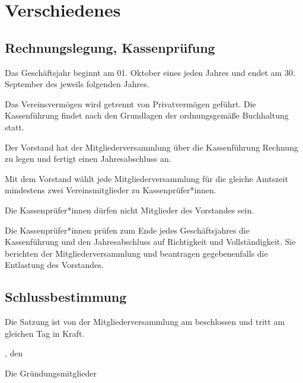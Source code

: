 \chapter{Verschiedenes}

\section{Rechnungslegung, Kassenprüfung}
\begin{absätze}
	\item Das Geschäftsjahr beginnt am 01. Oktober eines jeden Jahres und endet am 30. September des jeweils folgenden Jahres.
	\item Das Vereinsvermögen wird getrennt von Privatvermögen geführt. Die Kassenführung findet nach den Grundlagen der ordnungsgemäße Buchhaltung statt.
	\item Der Vorstand hat der Mitgliederversammlung über die Kassenführung Rechnung zu legen und fertigt einen Jahresabschluss an.
	\item Mit dem Vorstand wählt jede Mitgliederversammlung für die gleiche Amtszeit mindestens zwei Vereinsmitglieder zu Kassenprüfer*innen. 
	\item Die Kassenprüfer*innen dürfen nicht Mitglieder des Vorstandes sein. 
    \item Die Kassenprüfer*innen prüfen zum Ende jedes Geschäftsjahres die Kassenführung und den Jahresabschluss auf Richtigkeit und Vollständigkeit. Sie berichten der Mitgliederversammlung und beantragen gegebenenfalls die Entlastung des Vorstandes.
\end{absätze}

\section{Schlussbestimmung}
Die Satzung ist von der Mitgliederversammlung am \DatumSatzung{} beschlossen und tritt am gleichen Tag in Kraft.

\vfill %

\Stadt{}, den \DatumSatzung{}

Die Gründungsmitglieder
